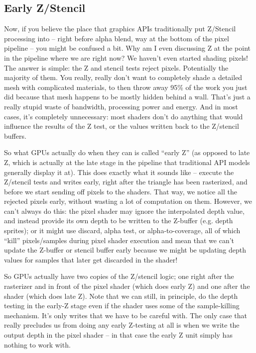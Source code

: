 \documentclass[12pt]{article}
\begin{document}
\subsection{Early Z/Stencil}
\label{sec:org27fc983}

Now, if you believe the place that graphics APIs traditionally put Z/Stencil processing into – right before alpha blend, way at the bottom of the pixel pipeline – you might be confused a bit. Why am I even discussing Z at the point in the pipeline where we are right now? We haven’t even started shading pixels! The answer is simple: the Z and stencil tests reject pixels. Potentially the majority of them. You really, really don’t want to completely shade a detailed mesh with complicated materials, to then throw away 95\% of the work you just did because that mesh happens to be mostly hidden behind a wall. That’s just a really stupid waste of bandwidth, processing power and energy. And in most cases, it’s completely unnecessary: most shaders don’t do anything that would influence the results of the Z test, or the values written back to the Z/stencil buffers.

So what GPUs actually do when they can is called “early Z” (as opposed to late Z, which is actually at the late stage in the pipeline that traditional API models generally display it at). This does exactly what it sounds like – execute the Z/stencil tests and writes early, right after the triangle has been rasterized, and before we start sending off pixels to the shaders. That way, we notice all the rejected pixels early, without wasting a lot of computation on them. However, we can’t always do this: the pixel shader may ignore the interpolated depth value, and instead provide its own depth to be written to the Z-buffer (e.g. depth sprites); or it might use discard, alpha test, or alpha-to-coverage, all of which “kill” pixels/samples during pixel shader execution and mean that we can’t update the Z-buffer or stencil buffer early because we might be updating depth values for samples that later get discarded in the shader!

So GPUs actually have two copies of the Z/stencil logic; one right after the rasterizer and in front of the pixel shader (which does early Z) and one after the shader (which does late Z). Note that we can still, in principle, do the depth testing in the early-Z stage even if the shader uses some of the sample-killing mechanism. It’s only writes that we have to be careful with. The only case that really precludes us from doing any early Z-testing at all is when we write the output depth in the pixel shader – in that case the early Z unit simply has nothing to work with.
\end{document}
